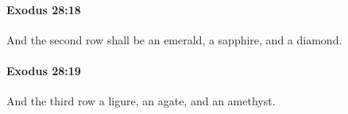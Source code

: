 		\paragraph{Exodus 28:18} %
			\label{EXODUS-28-18}

			And the second row shall be an emerald, a sapphire, and a diamond.


		\paragraph{Exodus 28:19} %
			\label{EXODUS-28-19}

			And the third row a ligure, an agate, and an amethyst.


